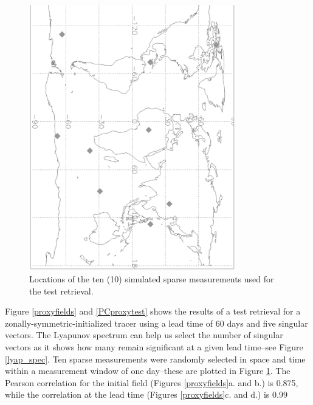 \documentclass{article}
\begin{document}
\begin{figure}
\begin{center}
\includegraphics[angle=90,width=0.8\textwidth]{../pc_proxy/meas_loc.eps}
\caption{Locations of the ten (10) simulated sparse measurements used for the
test retrieval.}\label{sparse}
\end{center}
\end{figure}

Figure \ref{proxyfields} and \ref{PCproxytest} 
shows the results of a test retrieval for a 
zonally-symmetric-initialized tracer using a lead time of 60 days
and five singular vectors.
The Lyapunov spectrum can help us select the number of singular vectors
as it shows how many remain significant at
a given lead time--see Figure \ref{lyap_spec}.
Ten sparse measurements were randomly selected in space and time
within a measurement window of one day--these are plotted in Figure \ref{sparse}.
The Pearson correlation for the initial field (Figures \ref{proxyfields}a. and b.)
is 0.875, while the correlation at the lead time 
(Figures \ref{proxyfields}c. and d.) is 0.99




\appendix
\end{document}
